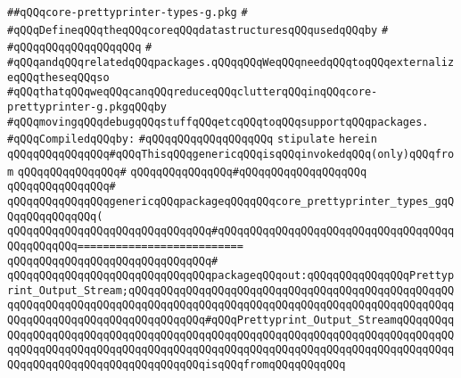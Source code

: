 \label{src/lib/prettyprint/big/src/core-prettyprinter-types-g.pkg}
\verb|##qQQqcore-prettyprinter-types-g.pkg|\newline
\verb|#|\newline
\verb|#qQQqDefineqQQqtheqQQqcoreqQQqdatastructuresqQQqusedqQQqby|\newline
\verb|#|\newline
\verb|#qQQqqQQqqQQqqQQqqQQq|\newline
\verb|#|\newline
\verb|#qQQqandqQQqrelatedqQQqpackages.qQQqqQQqWeqQQqneedqQQqtoqQQqexternalizeqQQqtheseqQQqso|\newline
\verb|#qQQqthatqQQqweqQQqcanqQQqreduceqQQqclutterqQQqinqQQqcore-prettyprinter-g.pkgqQQqby|\newline
\verb|#qQQqmovingqQQqdebugqQQqstuffqQQqetcqQQqtoqQQqsupportqQQqpackages.|\newline
\newline
\verb|#qQQqCompiledqQQqby:|\newline
\verb|#qQQqqQQqqQQqqQQqqQQq|\newline
\newline
\newline
\verb|stipulate|\newline
\verb|herein|\newline
\newline
\verb|qQQqqQQqqQQqqQQq#qQQqThisqQQqgenericqQQqisqQQqinvokedqQQq(only)qQQqfrom|\newline
\verb|qQQqqQQqqQQqqQQq#|\newline
\verb|qQQqqQQqqQQqqQQq#qQQqqQQqqQQqqQQqqQQq|\newline
\verb|qQQqqQQqqQQqqQQq#|\newline
\verb|qQQqqQQqqQQqqQQqgenericqQQqpackageqQQqqQQqcore_prettyprinter_types_gqQQqqQQqqQQqqQQq(|\newline
\verb|qQQqqQQqqQQqqQQqqQQqqQQqqQQqqQQq#qQQqqQQqqQQqqQQqqQQqqQQqqQQqqQQqqQQqqQQqqQQqqQQq==========================|\newline
\verb|qQQqqQQqqQQqqQQqqQQqqQQqqQQqqQQq#|\newline
\verb|qQQqqQQqqQQqqQQqqQQqqQQqqQQqqQQqpackageqQQqout:qQQqqQQqqQQqqQQqPrettyprint_Output_Stream;qQQqqQQqqQQqqQQqqQQqqQQqqQQqqQQqqQQqqQQqqQQqqQQqqQQqqQQqqQQqqQQqqQQqqQQqqQQqqQQqqQQqqQQqqQQqqQQqqQQqqQQqqQQqqQQqqQQqqQQqqQQqqQQqqQQqqQQqqQQqqQQqqQQqqQQq#qQQqPrettyprint_Output_StreamqQQqqQQqqQQqqQQqqQQqqQQqqQQqqQQqqQQqqQQqqQQqqQQqqQQqqQQqqQQqqQQqqQQqqQQqqQQqqQQqqQQqqQQqqQQqqQQqqQQqqQQqqQQqqQQqqQQqqQQqqQQqqQQqqQQqqQQqqQQqqQQqqQQqqQQqqQQqqQQqqQQqqQQqqQQqqQQqqQQqisqQQqfromqQQqqQQqqQQq|\newline
